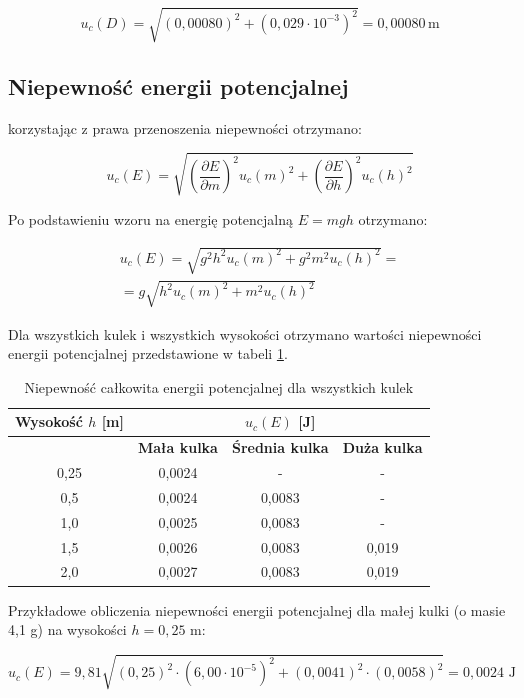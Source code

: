 \documentclass[a4paper,12pt]{article}
\begin{document}
$$
    u_c(D) = \sqrt{(0,00080)^2 + (0,029 \cdot 10^{-3})^2} = 0,00080 \, \text{m}
$$


\subsection{Niepewność energii potencjalnej}

korzystając z prawa przenoszenia niepewności otrzymano:


$$
    u_c(E) = \sqrt{\left(\frac{\partial E}{\partial m}\right)^2 u_c(m)^2 + \left(\frac{\partial E}{\partial h}\right)^2 u_c(h)^2}
$$

Po podstawieniu wzoru na energię potencjalną $E = mgh$ otrzymano:

\begin{align*}
    u_c(E) = \sqrt{g^2h^2 u_c(m)^2 + g^2m^2 u_c(h)^2} = \\
    = g\sqrt{h^2u_c(m)^2 + m^2u_c(h)^2}
\end{align*}

Dla wszystkich kulek i wszystkich wysokości otrzymano wartości niepewności energii potencjalnej przedstawione w tabeli \ref{tab:niepewnosc_calkowita_energii}.

\begin{table}[H]
    \centering
    \begin{tabular}{|c|c|c|c|}
        \hline
        \textbf{Wysokość $h$ [m]} & \multicolumn{3}{c|}{\textbf{$u_c(E)$ [J]}} \\
        \hline
        & \textbf{Mała kulka} & \textbf{Średnia kulka} & \textbf{Duża kulka} \\
        \hline
        0,25 & 0,0024 & - & - \\
        \hline
        0,5 & 0,0024 & 0,0083 & - \\
        \hline
        1,0 & 0,0025 & 0,0083 & - \\
        \hline
        1,5 & 0,0026 & 0,0083 & 0,019 \\
        \hline
        2,0 & 0,0027 & 0,0083 & 0,019 \\
        \hline
    \end{tabular}
    \caption{Niepewność całkowita energii potencjalnej dla wszystkich kulek}
    \label{tab:niepewnosc_calkowita_energii}
\end{table}

Przykładowe obliczenia niepewności energii potencjalnej dla małej kulki (o masie 4,1 g) na wysokości $h = 0,25$ m:

$$
    u_c(E) = 9,81 \sqrt{(0,25)^2 \cdot (6,00\cdot10^{-5})^2 + (0,0041)^2 \cdot (0,0058)^2} = 0,0024 \text{ J}
$$
\end{document}

